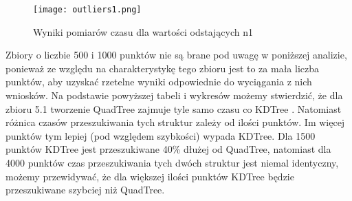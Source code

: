 \documentclass[a4paper, 12pt]{article}
\begin{document}
      \begin{figure}[h!]
      \centering
        \texttt{[image: outliers1.png]}
        \caption{Wyniki pomiarów czasu dla wartości odstających n1}
      \end{figure}

      \noindent
      \quad Zbiory o liczbie 500 i 1000 punktów nie są brane pod uwagę w poniższej analizie, ponieważ ze względu na charakterystykę tego zbioru jest to za mała liczba punktów, aby uzyskać  rzetelne wyniki odpowiednie do wyciągania z nich wniosków. Na podstawie powyższej tabeli i wykresów możemy stwierdzić, że dla zbioru 5.1 tworzenie QuadTree zajmuje tyle samo czasu co KDTree . Natomiast różnica czasów przeszukiwania tych struktur zależy od ilości punktów. Im więcej punktów tym lepiej (pod względem szybkości) wypada KDTree. Dla 1500 punktów KDTree jest przeszukiwane 40\% dłużej od QuadTree, natomiast dla 4000 punktów czas przeszukiwania tych dwóch struktur jest niemal identyczny, możemy przewidywać, że dla większej ilości punktów KDTree będzie przeszukiwane szybciej niż QuadTree. 
\end{document}
